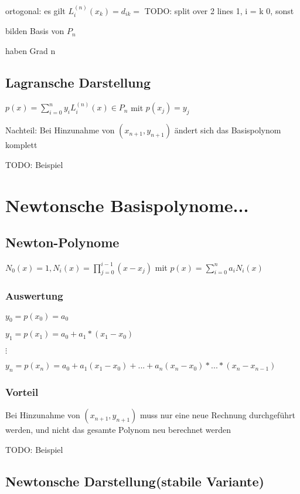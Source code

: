 \documentclass[12pt,a4paper]{article} %
\begin{document}
	ortogonal: es gilt $L_i^{(n)}(x_k) = d_{ik} =$ TODO: split over 2 lines    1, i = k 0, sonst
	
	bilden Basis von $P_n$
	
	haben Grad n
	
	\subsection{Lagransche Darstellung}
	
	$p(x) = \sum_{i = 0}^{n}y_iL_i^{(n)}(x) \in P_n$ mit $p(x_j) = y_j$
	
	Nachteil: Bei Hinzunahme von $(x_{n+1}, y_{n+1})$ ändert sich das Basispolynom komplett
	
	
	TODO: Beispiel
	
	\newpage
	
	\section{Newtonsche Basispolynome...}
	
	\subsection{Newton-Polynome}
	
	$N_0(x) = 1, N_i(x) = \prod_{j = 0}^{i - 1}(x - x_j)$ mit $p(x) = \sum_{i = 0}^{n}a_iN_i(x)$
	
	\subsubsection{Auswertung}
	
	$y_0 = p(x_0) = a_0$
	
	$y_1 = p(x_1) = a_0 + a_1 * (x_1 - x_0)$
	
	$\vdots$
	
	$y_n = p(x_n) = a_0 + a_1(x_1 - x_0) + ... + a_n(x_n - x_0) * ... * (x_n - x_{n - 1})$
	
	\subsubsection{Vorteil}
	
	Bei Hinzunahme von $(x_{n + 1}, y_{n + 1})$ muss nur eine neue Rechnung durchgeführt werden, und nicht das gesamte Polynom neu berechnet werden
	
	TODO: Beispiel
	
	\subsection[Newtonsche Darstellung]{Newtonsche Darstellung(stabile Variante)}
	
\end{document}
